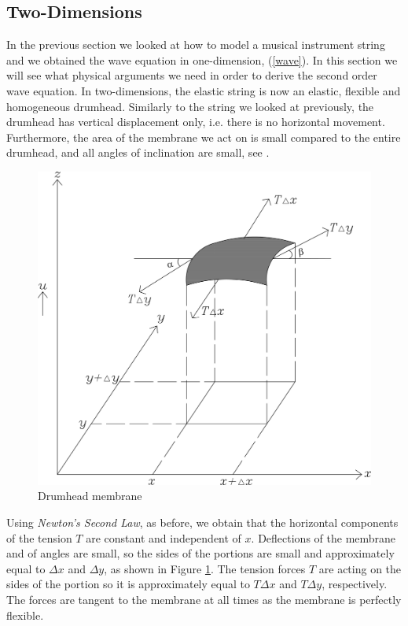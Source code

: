 \documentclass[a4paper, 12pt]{article}
\numberwithin{equation}{section}
\begin{document}
\subsection{Two-Dimensions} \label{twodim}
In the previous section we looked at how to model a musical instrument string and we obtained the wave equation in 
one-dimension, (\ref{wave}). In this section we will see what physical arguments we need in order to derive the second order wave equation.
In two-dimensions, the elastic string is now an elastic, flexible and homogeneous drumhead. Similarly to the string we looked at previously, 
the drumhead has vertical displacement only, i.e. there is no horizontal movement. Furthermore, the area of the membrane we act on is small
compared to the entire drumhead, and all angles of inclination are small, see \cite{Kr}.

\begin{figure}[h]
    \centering
    \includegraphics[scale=0.5]{images/grafic-5} 
    \caption{Drumhead membrane}
    \label{fig:2}
\end{figure}

Using \emph{Newton's Second Law}, as before, we obtain that the horizontal components of the tension $T$ are constant and independent of $x$.
Deflections of the membrane and of angles are small, so the sides of the portions are small and approximately equal to $\Delta x$ and $\Delta y$, 
as shown in Figure \ref{fig:2}. The tension forces $T$ are acting on the sides of the portion so it is approximately equal to $T\Delta x$ and $T\Delta y$, 
respectively. The forces are tangent to the membrane at all times as the membrane is perfectly flexible.
\\
\end{document}
